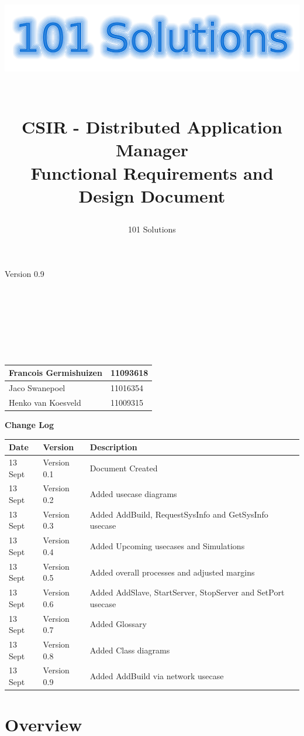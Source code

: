 \documentclass[a4paper,12pt,final]{article}
\title{
\begin{center}
  	\includegraphics[scale=0.3]{101Logo.png} 
  \end{center}
  \textbf{\\}
CSIR - Distributed Application Manager\\
Functional Requirements and Design Document\\
}
\author{101 Solutions}
\begin{document}
\maketitle
\begin{center}
Version 0.9
\end{center}
\textbf{\\}
\textbf{\\}
\textbf{\\}
\textbf{\\}
\textbf{\\}
\textbf{\\}
\begin{center}
\begin{tabular}{|l|l|}
\hline
Francois Germishuizen & 11093618\\
\hline
Jaco Swanepoel & 11016354\\
\hline
Henko van Koesveld & 11009315\\
\hline
\end{tabular}
\end{center}
\thispagestyle{empty}
\newpage
\thispagestyle{empty}
\textbf{\large{Change Log}}
\vspace{6pt}\newline
\begin{tabular}{|l|l|l|}
\hline
Date & Version & Description\\
\hline
13 Sept & Version 0.1 & Document Created\\
\hline
13 Sept & Version 0.2 & Added usecase diagrams\\
\hline
13 Sept & Version 0.3 & Added AddBuild, RequestSysInfo and GetSysInfo usecase\\
\hline
13 Sept & Version 0.4 & Added Upcoming usecases and Simulations\\
\hline
13 Sept & Version 0.5 & Added overall processes and adjusted margins\\
\hline
13 Sept & Version 0.6 & Added AddSlave, StartServer, StopServer and SetPort usecase\\
\hline
13 Sept & Version 0.7 & Added Glossary\\
\hline
13 Sept & Version 0.8 & Added Class diagrams\\
\hline
13 Sept & Version 0.9 & Added AddBuild via network usecase\\
\hline
\end{tabular}
\newpage
\tableofcontents
\thispagestyle{empty}
\newpage

\section{Overview}
\end{document}

